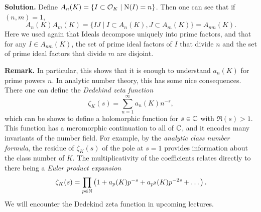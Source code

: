 \documentclass[a4paper,11pt]{article}
\begin{document}
\textbf{Solution.}
Define $A_n(K) = \{I \subset \mathcal{O}_K \mid \operatorname{N}(I) = n\}$. Then 
one can see that if $(n,m) = 1$, 
$$A_n(K) A_m(K) = \{IJ \mid I \subset A_n(K), J \subset A_m(K)\} = 
A_{nm}(K).$$ 
Here we used again that Ideals decompose uniquely into prime factors, and 
that for any $I \in A_{nm}(K)$, the set of prime ideal factors of $I$ that divide
$n$ and the set of prime ideal factors that divide $m$ are disjoint. 

\textbf{Remark.} In particular, this shows that it is enough to understand 
$a_{n}(K)$ for prime powers $n$. In analytic number theory, this has some nice
consequences. There one can define the \textit{Dedekind zeta function} 
\begin{equation*}
    \zeta_K(s) = \sum_{n = 1}^{\infty} a_n(K) n^{-s},
\end{equation*}
which can be shows to define a holomorphic function for $s \in \mathbb{C}$ with $\Re(s) > 1$.
This function has a meromorphic continuation to all of $\mathbb{C}$, and it encodes many
invariants of the number field. For example, by the \textit{analytic class
number formula}, the residue of $\zeta_K(s)$ of the pole at $s=1$ provides
information about the class number of $K$.
The multiplicativity of the coefficients relates directly to there being a 
\textit{Euler product expansion}
\begin{equation*}
    \zeta_K(s) = \prod_{p \in \mathbb{N}} \left( 1 + a_p(K)p^{-s} + a_{p^2}(K) p^{-2s}
    + \dots \right).
\end{equation*}
We will encounter the Dedekind zeta function in upcoming lectures.

\contactend
\end{document}

